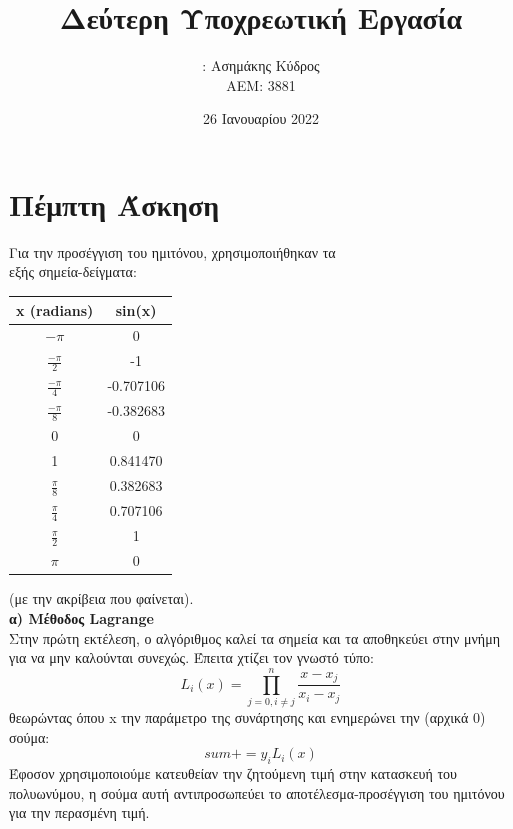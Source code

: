 \documentclass{article}
\title{\gt \textbf{Δεύτερη Υποχρεωτική Εργασία}}
\author{\gt \LargeΟνοματεπώνυμο: Ασημάκης Κύδρος \\ ΑΕΜ: 3881}
\date{\gt \Large26 Ιανουαρίου 2022}
\newcommand{\lt}{\latintext}
\newcommand{\gt}{\greektext}
\begin{document}
\maketitle

\pagebreak
\section{\gt Πέμπτη Άσκηση}
\Large
\gt Για την προσέγγιση του ημιτόνου, χρησιμοποιήθηκαν τα \\εξής σημεία-δείγματα:
\begin{center}
    \begin{tabular}{|c|c|}
        \hline
        \lt x (radians)    & \lt sin(x)    \\\hline
        $-\pi$             & 0         \\\hline
        $\frac{-\pi}{2}$   & -1        \\\hline
        $\frac{-\pi}{4}$   & -0.707106 \\\hline
        $\frac{-\pi}{8}$   & -0.382683 \\\hline
        0                  & 0           \\\hline
        1                  & 0.841470    \\\hline
        $\frac{\pi}{8}$    & 0.382683  \\\hline
        $\frac{\pi}{4}$    & 0.707106  \\\hline
        $\frac{\pi}{2}$    & 1         \\\hline
        $\pi$              & 0         \\\hline
    \end{tabular}
\end{center}
\gt (με την ακρίβεια που φαίνεται).\\

\textbf{\gt α) Μέθοδος \lt Lagrange}\\
\gt Στην πρώτη εκτέλεση, ο αλγόριθμος καλεί τα σημεία και τα αποθηκεύει στην μνήμη
\gt για να μην καλούνται συνεχώς. Έπειτα χτίζει τον γνωστό τύπο:
\begin{equation*}
    L_i(x) = \displaystyle \prod_{j=0, i \neq j}^{n}\frac{x - x_j}{x_i - x_j}
\end{equation*}
\gt θεωρώντας όπου \lt x \gt την παράμετρο της συνάρτησης και ενημερώνει την (αρχικά 0) σούμα:
\begin{equation*}
    sum += y_iL_i(x)
\end{equation*}
\gt Έφοσον χρησιμοποιούμε κατευθείαν την ζητούμενη τιμή στην κατασκευή του πολυωνύμου,
\gt η σούμα αυτή αντιπροσωπεύει το αποτέλεσμα-προσέγγιση του ημιτόνου για την περασμένη τιμή.
\end{document}
